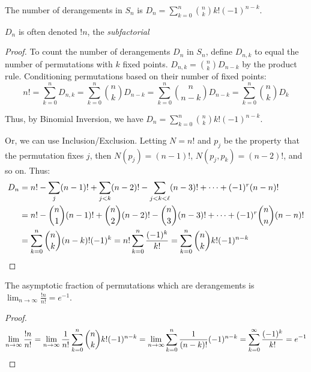 \documentclass[a4paper]{article}
\begin{document}
\begin{theorem}\label{derangements}
The number of derangements in $S_n$ is $D_n=\sum_{k=0}^n\binom nkk!(-1)^{n-k}$.
\begin{arrows}
\item $D_n$ is often denoted $!n$, the \emph{subfactorial}
\end{arrows}

\begin{hl}
\begin{proof}
To count the number of derangements $D_n$ in $S_n$, define $D_{n,k}$ to equal the number of permutations with $k$ fixed points. $D_{n,k}=\binom nkD_{n-k}$ by the product rule. Conditioning permutations based on their number of fixed points:
\begin{equation*}
n!
=\sum_{k=0}^nD_{n,k}
=\sum_{k=0}^n\binom nkD_{n-k}
=\sum_{k=0}^n\binom n{n-k}D_{n-k}
=\sum_{k=0}^n\binom nkD_k
\end{equation*}

Thus, by Binomial Inversion, we have $D_n=\sum_{k=0}^n\binom nkk!(-1)^{n-k}$.

\medskip

Or, we can use Inclusion/Exclusion. Letting $N=n!$ and $p_j$ be the property that the permutation fixes $j$, then $N(p_j)=(n-1)!$, $N(p_j,p_k)=(n-2)!$, and so on. Thus:
\begin{align*}
D_n
&=n!-\sum_{j}(n-1)!+\sum_{j<k}(n-2)!-\sum_{j<k<\ell}(n-3)!+\cdots+(-1)^r(n-n)!\\
&=n!-\binom n1(n-1)!+\binom n2(n-2)!-\binom n3(n-3)!+\cdots+(-1)^r\binom nn(n-n)!\\
&=\sum_{k=0}^n\binom nk(n-k)!(-1)^k
=n!\sum_{k=0}^n\frac{(-1)^k}{k!}
=\sum_{k=0}^n\binom{n}kk!(-1)^{n-k}\qedhere
\end{align*}
\end{proof}
\end{hl}
\end{theorem}

\begin{corollary}
The asymptotic fraction of permutations which are derangements is $\displaystyle\lim_{n\rightarrow\infty}\frac{!n}{n!}=e^{-1}$.

\begin{hl}
\begin{proof}
\begin{equation*}
\lim_{n\rightarrow\infty}\frac{!n}{n!}
=\lim_{n\rightarrow\infty}\frac1{n!}\sum_{k=0}^n\binom nkk!(-1)^{n-k}
=\lim_{n\rightarrow\infty}\sum_{k=0}^n\frac1{(n-k)!}(-1)^{n-k}
=\sum_{k=0}^{\infty}\frac{(-1)^{k}}{k!}
=e^{-1}\qedhere
\end{equation*}
\end{proof}
\end{hl}
\end{corollary}
\end{document}
